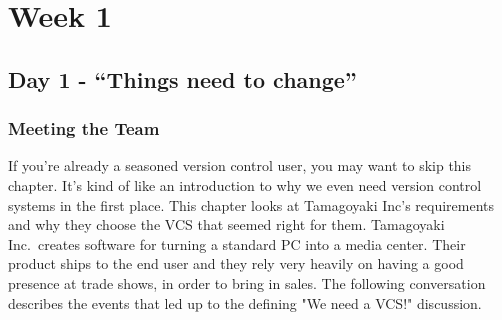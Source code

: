 \chapter{Week 1}
\section{Day 1 - ``Things need to change''}
\subsection{Meeting the Team}
If you're already a seasoned version control user, you may want to skip this chapter.
It's kind of like an introduction to why we even need version control systems in the first place.
This chapter looks at Tamagoyaki Inc's requirements and why they choose the VCS that seemed right for them.
Tamagoyaki Inc.\ creates software for turning a standard PC into a media center.
Their product ships to the end user and they rely very heavily on having a good presence at trade shows, in order to bring in sales.
The following conversation describes the events that led up to the defining "We need a VCS!" discussion.

